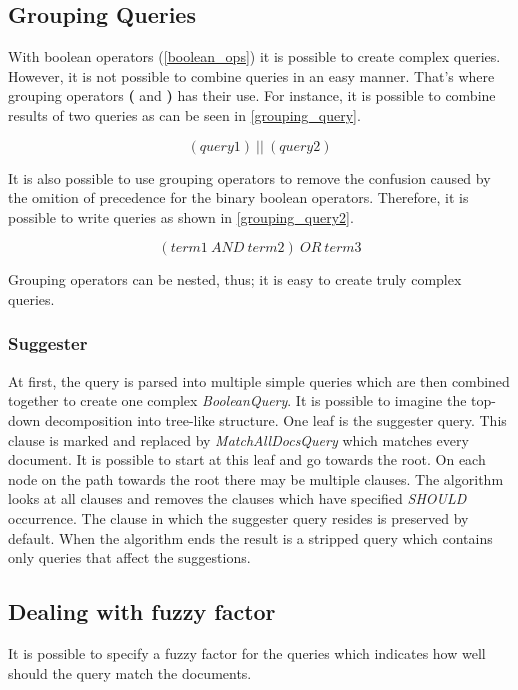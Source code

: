 \subsection{Grouping Queries}
\label{grouping_queries}
With boolean operators (\ref{boolean_ops}) it is possible to create complex queries. However, it is not possible to
combine queries in an easy manner. That's where grouping operators \textbf{(} and \textbf{)} has their use. For instance,
it is possible to combine results of two queries as can be seen in \ref{grouping_query}.

\begin{equation}
\label{grouping_query}
(query1)\ \vert\vert\ (query2)
\end{equation}

It is also possible to use grouping operators to remove the confusion caused by the omition of precedence for the binary
boolean operators. Therefore, it is possible to write queries as shown in \ref{grouping_query2}.

\begin{equation}
\label{grouping_query2}
(term1\ AND\ term2)\ OR\ term3
\end{equation}

Grouping operators can be nested, thus; it is easy to create truly complex queries.

\subsubsection{Suggester}

At first, the query is parsed into multiple simple queries which are then combined together to create one complex
\textit{BooleanQuery}. It is possible to imagine the top-down decomposition into tree-like structure. %
One leaf is the suggester query. This clause is marked and replaced by \textit{MatchAllDocsQuery} which matches every
document. %
It is possible to start at this leaf and go towards the root. On each node on the path towards the root there may be
multiple clauses. The algorithm looks at all clauses and removes the clauses which have specified \textit{SHOULD}
occurrence. The clause in which the suggester query resides is preserved by default. When the algorithm ends the result
is a stripped query which contains only queries that affect the suggestions.

\subsection{Dealing with fuzzy factor}
It is possible to specify a fuzzy factor for the queries which indicates how well should the query match the documents.

